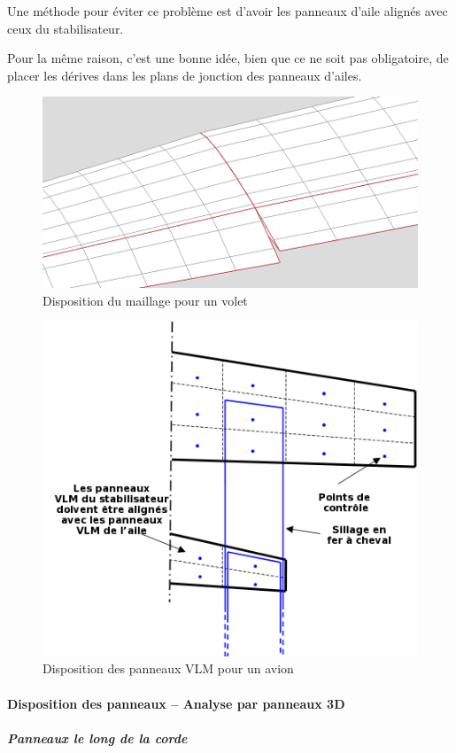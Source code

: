\documentclass[a4paper,twoside,12pt,dvips]{article}
\begin{document}
Une méthode pour éviter ce problème est d’avoir les panneaux d’aile alignés  avec ceux du stabilisateur.

Pour la même raison, c’est une bonne idée, bien que ce ne soit pas obligatoire, de placer les dérives dans les plans de jonction des panneaux d’ailes. 

\begin{figure}[!ht]
	\centering
	\includegraphics[width=0.7\linewidth]{img-11}
	\caption{Disposition du maillage pour un volet}
	\label{img:maillage_volet}
\end{figure}

\begin{figure}[!ht]
	\centering
	\includegraphics[width=0.7\linewidth]{img-12-fr}
	\caption{Disposition des panneaux VLM pour un avion}
	\label{img:panneaux_VLM_avion}
\end{figure}

\clearpage

\paragraph{Disposition des panneaux – Analyse par panneaux 3D}

\subparagraph{Panneaux le long de la corde}
\end{document}
